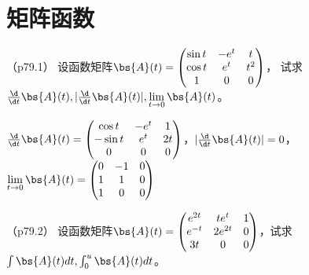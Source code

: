 \documentclass[12pt, a4paper, oneside, UTF8]{ctexbook}
\begin{document}
\else
\fi

\chapter{矩阵函数}
\begin{question}（p79.1）
设函数矩阵$\bs{A}(t)=\begin{pmatrix}
    \sin t &-e^t & t \\
    \cos t & e^t & t^2 \\
    1 & 0 & 0
\end{pmatrix}$，
试求$\frac{\d }{\d t} \bs{A}(t),|\frac{\d }{\d t} \bs{A}(t)|,\lim\limits_{t \to 0} \bs{A}(t)$。
\end{question}

\begin{solution}
    $\frac{\d }{\d t} \bs{A}(t)=\begin{pmatrix}
    \cos t &-e^t & 1 \\
    -\sin t & e^t & 2t \\
    0 & 0 & 0
    \end{pmatrix}$，$|\frac{\d }{\d t} \bs{A}(t)|=0$，
    $\lim\limits_{t \to 0} \bs{A}(t)=\begin{pmatrix}
        0 &-1 & 0 \\
        1 & 1 & 0 \\
        1 & 0 & 0
    \end{pmatrix}$

\end{solution}

\begin{question}（p79.2）
    设函数矩阵$\bs{A}(t)=\begin{pmatrix}
        e^{2t}& te^t & 1\\
        e^{-t} & 2e^{2t} & 0\\
        3t & 0 & 0
    \end{pmatrix}$，试求$\int \bs{A}(t) dt,\int_{0}^u \bs{A}(t)dt$。
\end{question}
\end{document}
